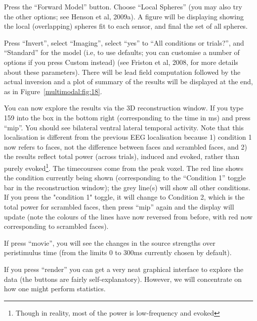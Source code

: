 Press the ``Forward Model'' button. Choose ``Local Spheres'' (you may also try the other options; see Henson et al, 2009a). A figure will be displaying showing the local (overlapping) spheres fit to each sensor, and final the set of all spheres.

Press ``Invert'', select ``Imaging'', select ``yes'' to ``All conditions or trials?'', and ``Standard'' for the model (i.e, to use defaults; you can customise a number of options if you press Custom instead) (see Friston et al, 2008, for more details about these parameters). There will be lead field computation followed by the actual inversion and a plot of summary of the results will be displayed at the end, as in Figure~\ref{multimodal:fig:18}.

You can now explore the results via the 3D reconstruction window. If you type 159 into the box in the bottom right (corresponding to the time in ms) and press ``mip''. You should see bilateral ventral lateral temporal activity. Note that this localisation is different from the previous EEG localisation because 1) condition 1 now refers to faces, not the difference between faces and scrambled faces, and 2) the results reflect total power (across trials), induced and evoked, rather than purely evoked\footnote{Though in reality, most of the power is low-frequency and evoked}. The timecourses come from the peak voxel. The red line shows the condition currently being shown (corresponding to the ``Condition 1'' toggle bar in the reconstruction window); the grey line(s) will show all other conditions. If you press the "condition 1" toggle, it will change to Condition 2, which is the total power for scrambled faces, then press ``mip'' again and the display will update (note the colours of the lines have now reversed from before, with red now corresponding to scrambled faces).

If press ``movie'', you will see the changes in the source strengths over peristimulus time (from the limits 0 to 300ms currently chosen by default).

If you press ``render'' you can get a very neat graphical interface to explore the data (the buttons are fairly self-explanatory). However, we will concentrate on how one might perform statistics.

